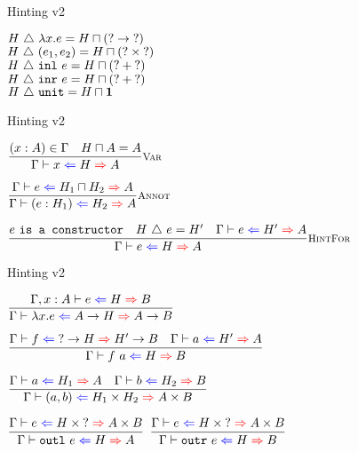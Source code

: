 \documentclass{beamer}
\newcommand{\Fun}[2]{#1 \to #2}
\newcommand{\Prod}[2]{#1 \times #2}
\newcommand{\Sum}[2]{#1 + #2}
\newcommand{\Unit}{\textbf{1}}
\newcommand{\annot}[2]{(#1 : #2)}
\newcommand{\fun}[2]{\lambda #1. #2}
\newcommand{\app}[2]{#1\ #2}
\newcommand{\pair}[2]{(#1, #2)}
\newcommand{\outl}[1][]{\texttt{outl}\ #1}
\newcommand{\outr}[1][]{\texttt{outr}\ #1}
\newcommand{\inl}[1][]{\texttt{inl}\ #1}
\newcommand{\inr}[1][]{\texttt{inr}\ #1}
\newcommand{\unit}{\texttt{unit}}
\newcommand{\infrule}[3][]{\displaystyle \frac{#2}{#3} \textsc{\footnotesize{#1}}}
\newcommand{\extend}[3]{#1, #2 : #3}
\newcommand{\sidecond}[1]{#1}
\begin{document}
\newcommand{\hintfor}[2]{#1\ \triangle\ #2}

\begin{frame}{Hinting v2}

\begin{center}
  $\hintfor{H}{\fun{x}{e}} = \combinehints{H}{(\Fun{\Hint}{\Hint})}$ \\
  $\hintfor{H}{\pair{e_1}{e_2}} = \combinehints{H}{(\Prod{\Hint}{\Hint})}$ \\
  $\hintfor{H}{\inl[e]} = \combinehints{H}{(\Sum{\Hint}{\Hint})}$ \\
  $\hintfor{H}{\inr[e]} = \combinehints{H}{(\Sum{\Hint}{\Hint})}$ \\
  $\hintfor{H}{\unit} = \combinehints{H}{\Unit}$
\end{center}

\end{frame}

\begin{frame}{Hinting v2}

\begin{center}
  $\infrule[Var]{\sidecond{(x : A) \in \Gamma} \quad \sidecond{\combinehints{H}{A} = A}}{\hinting{x}{H}{A}}$

  \vspace{2em}

  $\infrule[Annot]{\hinting{e}{\combinehints{H_1}{H_2}}{A}}{\hinting{\annot{e}{H_1}}{H_2}{A}}$

  \vspace{2em}

  $\infrule[HintFor]{\sidecond{e\ \texttt{is a constructor}} \quad \sidecond{\hintfor{H}{e} = H'} \quad \hinting{e}{H'}{A}}{\hinting{e}{H}{A}}$
\end{center}
  
\end{frame}
  
\begin{frame}{Hinting v2}
  
\begin{center}
  $\infrule{\fullhinting{\extend{\Gamma}{x}{A}}{e}{H}{B}}{\hinting{\fun{x}{e}}{\Fun{A}{H}}{\Fun{A}{B}}}$

  \vspace{1em}

  $\infrule{\hinting{f}{\Fun{\Hint}{H}}{\Fun{H'}{B}} \quad \hinting{a}{H'}{A}}{\hinting{\app{f}{a}}{H}{B}}$

  \vspace{1em}

  $\infrule{\hinting{a}{H_1}{A} \quad \hinting{b}{H_2}{B}}{\hinting{\pair{a}{b}}{\Prod{H_1}{H_2}}{\Prod{A}{B}}}$

  \vspace{1em}

  $\infrule{\hinting{e}{\Prod{H}{\Hint}}{\Prod{A}{B}}}{\hinting{\outl[e]}{H}{A}}$ \quad
  $\infrule{\hinting{e}{\Prod{H}{\Hint}}{\Prod{A}{B}}}{\hinting{\outr[e]}{H}{B}}$
\end{center}
  
\end{frame}
  
\end{document}
